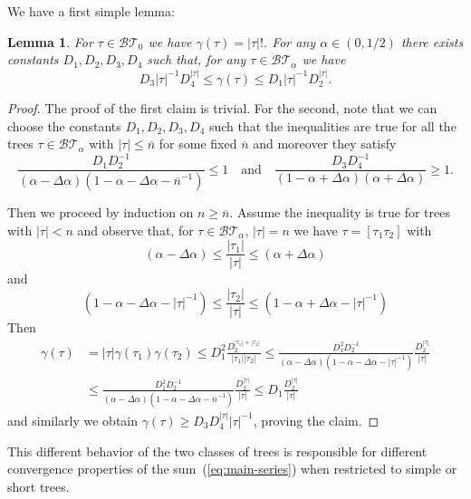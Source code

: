 \documentclass[a4paper,12pt,reqno]{amsart}
\newcommand{\1}{{\bf 1}}
\newtheorem{lemma}[theorem]{Lemma}
\newcommand{\BT}{\mathcal{BT}}
\begin{document}
  We have a
first simple lemma:
\begin{lemma}
\label{lemma:comb}
For $\tau \in \BT_0$ we have $\gamma(\tau) = |\tau|!$. For any $\alpha
\in (0,1/2)$ there exists constants $D_1,D_2,D_3,D_4$ such that, for any
$\tau \in \BT_\alpha$ we have
$$
 D_3   |\tau|^{-1} D_4^{|\tau|} \le \gamma(\tau) \le D_1   |\tau|^{-1} D_2^{|\tau|}.
$$  
\end{lemma}
\begin{proof}
The proof of the first claim is trivial. For the second, note that we
can choose the constants $D_1,D_2,D_3,D_4$ such that the inequalities are true for all
the trees $\tau \in \BT_\alpha$  with $|\tau| \le \overline n$ for some fixed
$\overline n$ and moreover they satisfy
\begin{equation*}
\frac{D_1 D_2^{-1}}{(\alpha-\Delta\alpha)(1-\alpha-\Delta\alpha-\overline n^{-1})}  \le 1
\quad\text{and}\quad
\frac{D_3 D_4^{-1}}{(1-\alpha+\Delta\alpha)(\alpha+\Delta\alpha)}  \ge 1.
\end{equation*}


 Then we proceed by induction on $n \ge \overline n$. Assume the inequality is true for trees with $|\tau| < n$ and  observe that, for $\tau \in
\BT_\alpha$, $|\tau| = n$ we have $\tau = [\tau_1 \tau_2]$ with 
$$
(\alpha-\Delta\alpha) \le \frac{|\tau_1|}{|\tau|} \le (\alpha+\Delta\alpha)
$$
and
$$
(1-\alpha-\Delta\alpha-|\tau|^{-1}) \le \frac{|\tau_2|}{|\tau|} \le (1-\alpha+\Delta\alpha-|\tau|^{-1})
$$
Then
\begin{equation*}
  \begin{split}
\gamma(\tau) & = |\tau| \gamma(\tau_1) \gamma(\tau_2)    
\le D_1^2 \frac{D_2^{|\tau_1|+|\tau_2|}}{|\tau_1||\tau_2|}
\le \frac{D_1^2 D_2^{-1}}{(\alpha-\Delta\alpha)(1-\alpha-\Delta\alpha-|\tau|^{-1})} \frac{D_2^{|\tau|}}{|\tau|} 
\\ & \le \frac{D_1^2 D_2^{-1}}{(\alpha-\Delta\alpha)(1-\alpha-\Delta\alpha-\overline n^{-1})} \frac{D_2^{|\tau|}}{|\tau|} 
 \le  D_1 \frac{D_2^{|\tau|}}{|\tau|} 
  \end{split}
\end{equation*}
and similarly we obtain
$
\gamma(\tau) \ge D_3 D_4^{|\tau|} |\tau|^{-1}
$,
proving the claim.
\end{proof}

This different behavior of the two classes of trees is responsible for
different convergence properties of the sum~(\ref{eq:main-series}) when
restricted to simple or short trees.
\end{document}
